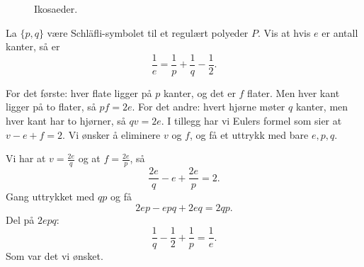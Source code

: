\documentclass[11pt, norsk]{article}
\begin{document}
\begin{losn}
\begin{figure}
  \caption{Ikosaeder.}
  
\end{figure}
\end{losn}

\begin{oppg}
La $\{ p,q\}$ være Schläfli-symbolet til et regulært polyeder $P$. Vis at hvis $e$ er antall kanter, så er 
\[
\frac 1e = \frac 1p + \frac 1q - \frac 12.
\]
\end{oppg}
\begin{losn}
For det første: hver flate ligger på $p$ kanter, og det er $f$ flater. Men hver kant ligger på to flater, så $pf = 2e$. For det andre: hvert hjørne møter $q$ kanter, men hver kant har to hjørner, så $qv=2e$. I tillegg har vi Eulers formel som sier at $v-e+f=2$. Vi ønsker å eliminere $v$ og $f$, og få et uttrykk med bare $e,p,q$.

Vi har at $v = \frac{2e}{q}$ og at $f = \frac{2e}{p}$, så 
\[
\frac{2e}{q} - e + \frac{2e}{p} = 2.
\]
Gang uttrykket med $qp$ og få
\[
2ep - epq + 2eq = 2qp.
\]
Del på $2epq$:
\[
\frac{1}{q} - \frac{1}{2} + \frac{1}{p} = \frac{1}{e}.
\]
Som var det vi ønsket.
\end{losn}
\end{document}
